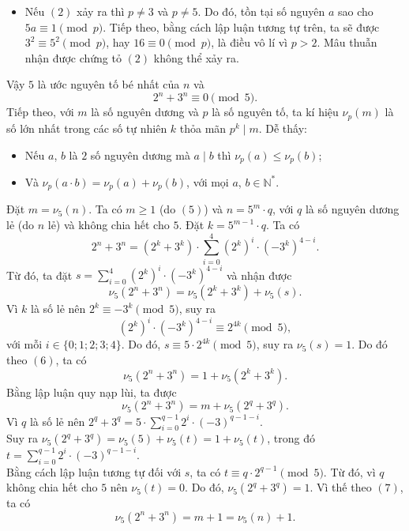 \begin{bt}
{\begin{enumerate}
\begin{itemize}
				Do đó, $ p=5 $.
				\item Nếu $ (2) $ xảy ra thì $ p\neq 3 $ và $ p\neq 5 $. Do đó, tồn tại số nguyên $ a $ sao cho $ 5a\equiv 1\pmod{p} $.
				Tiếp theo, bằng cách lập luận tương tự trên, ta sẽ được
				$ 3^{2}\equiv 5^{2}\pmod{p} $, hay $ 16\equiv 0\pmod{p} $, là điều vô lí vì $ p>2 $. Mâu thuẫn nhận được chứng tỏ $ (2) $ không thể xảy ra.
			\end{itemize}
			Vậy $ 5 $ là ước nguyên tố bé nhất của $ n $ và
			\[ 2^{n}+3^{n}\equiv 0\pmod{5}.\tag{5} \]
			Tiếp theo, với $ m $ là số nguyên dương và $ p $ là số nguyên tố, ta kí hiệu $ \nu_{p}(m) $ là số lớn nhất trong các số tự nhiên $ k $ thỏa mãn $ p^{k}\mid m $. Dễ thấy:
			\begin{itemize}
				\item Nếu $ a $, $ b $ là $ 2 $ số nguyên dương mà $ a\mid b $ thì $ \nu_{p}(a)\leq  \nu_{p}(b) $;
				\item Và $ \nu_{p}(a\cdot b)=\nu_{p}(a)+\nu_{p}(b) $, với mọi $ a $, $ b\in\mathbb{N}^{*} $.
			\end{itemize}
			Đặt $ m=\nu_{5}(n) $. Ta có $ m\geq 1 $ (do $ (5) $) và $ n=5^{m}\cdot q $, với $ q $ là số nguyên dương lẻ (do $ n $ lẻ) và không chia hết cho $ 5 $.
			Đặt $ k=5^{m-1}\cdot q $. Ta có 
			$$ 2^{n}+3^{n}=(2^{k}+3^{k})\cdot \displaystyle\sum\limits_{i=0}^{4}(2^{k})^{i}\cdot (-3^{k})^{4-i}.$$
			Từ đó, ta đặt $ s=\displaystyle\sum\limits_{i=0}^{4}(2^{k})^{i}\cdot (-3^{k})^{4-i} $ và nhận được
			\[ 
			\nu_{5}(2^{n}+3^{n})=\nu_{5}(2^{k}+3^{k})+\nu_{5}(s).\tag{6}
			\]
			Vì $ k $ là số lẻ nên $ 2^{k}\equiv -3^{k}\pmod{5} $, suy ra 
			$$ (2^{k})^{i}\cdot (-3^{k})^{4-i}\equiv 2^{4k}\pmod{5},$$
			với mỗi $ i\in \{0;1;2;3;4\} $. Do đó, $ s\equiv 5\cdot 2^{4k}\pmod{5} $, suy ra $ \nu_{5}(s)=1 $.
			Do đó theo $ (6) $, ta có 
			$$ \nu_{5}(2^{n}+3^{n})=1+\nu_{5}(2^{k}+3^{k}).$$
			Bằng lập luận quy nạp lùi, ta được
			\[ \nu_{5}(2^{n}+3^{n})=m+\nu_{5}(2^{q}+3^{q}).\tag{7} \]
			Vì $ q $ là số lẻ nên $ 2^{q}+3^{q}=5\cdot \displaystyle\sum\limits_{i=0}^{q-1}2^{i}\cdot (-3)^{q-1-i} $.\\
			Suy ra $ \nu_{5}(2^{q}+3^{q})=\nu_{5}(5)+\nu_{5}(t)=1+\nu_{5}(t) $, trong đó $ t=\displaystyle\sum\limits_{i=0}^{q-1}2^{i}\cdot (-3)^{q-1-i} $.\\
			Bằng cách lập luận tương tự đối với $ s $, ta có $ t\equiv q\cdot 2^{q-1}\pmod{5} $. Từ đó, vì $ q $ không chia hết cho $ 5 $ nên $ \nu_{5}(t)=0 $. Do đó, $ \nu_{5}(2^{q}+3^{q})=1 $. Vì thế theo $ (7) $, ta có
			\[ 
			\nu_{5}(2^{n}+3^{n})=m+1=\nu_{5}(n)+1.\tag{8}
\]
\end{enumerate}}
\end{bt}
